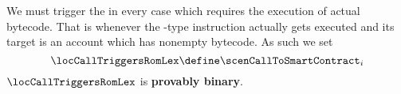We must trigger the \romLexMod{} in every case which requires the execution of actual bytecode.
That is whenever the -type instruction actually gets executed and its target is an account which has nonempty bytecode. As such we set 
\[
	\locCallTriggersRomLex
	\define
	\scenCallToSmartContract_{i}
\]
\saNote{}
$\locCallTriggersRomLex$ is \textbf{provably binary}.
